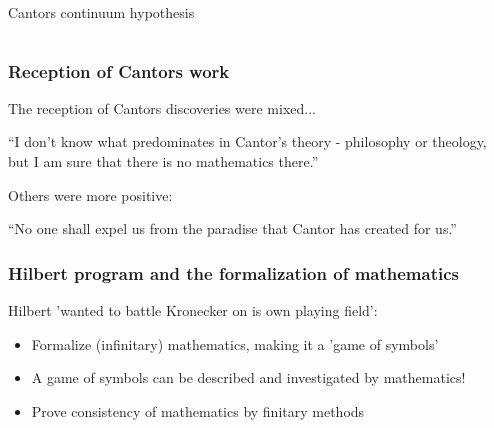 \documentclass[10pt,danish]{beamer}
\begin{document}
\begin{frame}[t]
\begin{columns}
\centering
{}
Cantors continuum hypothesis
\end{columns}
\end{frame}

\begin{frame}
\frametitle{Reception of Cantors work}
The reception of Cantors discoveries were mixed...
\begin{exampleblock}{}
  {``I don't know what predominates in Cantor's theory - philosophy or theology, but I am sure that there is no mathematics there.''}
  \vskip5mm
  \hspace*{}
\end{exampleblock}
Others were more positive:\\
 \begin{exampleblock}{}
  {``No one shall expel us from the paradise that Cantor has created for us.''}
  \vskip5mm
  \hspace*{}
 \end{exampleblock}
\end{frame}

\begin{frame}
 \frametitle{Hilbert program and the formalization of mathematics}
Hilbert 'wanted to battle Kronecker on is own playing field':
\begin{itemize}
 \item Formalize (infinitary) mathematics, making it a 'game of symbols'
 \item A game of symbols can be described and investigated by mathematics!
 \item Prove consistency of mathematics by finitary methods
\end{itemize}
\end{frame}
\end{document}
